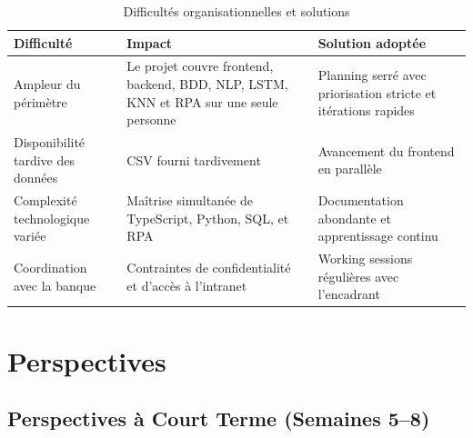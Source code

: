 \documentclass[12pt,a4paper]{report}
\begin{document}
\begin{table}[H]
\centering
\caption{Difficultés organisationnelles et solutions}
\begin{tabularx}{\textwidth}{|l|X|X|}
\hline
\textbf{Difficulté} & \textbf{Impact} & \textbf{Solution adoptée} \\
\hline
Ampleur du périmètre & Le projet couvre frontend, backend, BDD, NLP, LSTM, KNN et RPA sur une seule personne & Planning serré avec priorisation stricte et itérations rapides \\
\hline
Disponibilité tardive des données & CSV fourni tardivement & Avancement du frontend en parallèle \\
\hline
Complexité technologique variée & Maîtrise simultanée de TypeScript, Python, SQL, et RPA & Documentation abondante et apprentissage continu \\
\hline
Coordination avec la banque & Contraintes de confidentialité et d'accès à l'intranet & Working sessions régulières avec l'encadrant \\
\hline
\end{tabularx}
\end{table}


\chapter{Perspectives}

\section{Perspectives à Court Terme (Semaines 5--8)}
\end{document}
